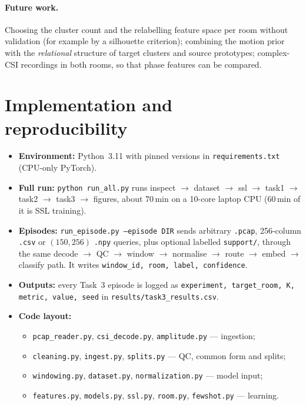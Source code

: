 \documentclass[11pt,a4paper]{article}
\begin{document}
\paragraph{Future work.} Choosing the cluster count and the relabelling feature space per room without validation (for example by a silhouette criterion); combining the motion prior with the \emph{relational} structure of target clusters and source prototypes; complex-CSI recordings in both rooms, so that phase features can be compared.

\section{Implementation and reproducibility}

\begin{itemize}
  \item \textbf{Environment:} Python~3.11 with pinned versions in \texttt{requirements.txt} (CPU-only PyTorch).
  \item \textbf{Full run:} \texttt{python run\_all.py} runs inspect $\to$ dataset $\to$ ssl $\to$ task1 $\to$ task2 $\to$ task3 $\to$ figures, about 70\,min on a 10-core laptop CPU (60\,min of it is SSL training).
  \item \textbf{Episodes:} \texttt{run\_episode.py --episode DIR} sends arbitrary \texttt{.pcap}, 256-column \texttt{.csv} or $(150,256)$ \texttt{.npy} queries, plus optional labelled \texttt{support/}, through the same decode $\to$ QC $\to$ window $\to$ normalise $\to$ route $\to$ embed $\to$ classify path. It writes \texttt{window\_id, room, label, confidence}.
  \item \textbf{Outputs:} every Task~3 episode is logged as \texttt{experiment, target\_room, K, metric, value, seed} in \texttt{results/task3\_results.csv}.
  \item \textbf{Code layout:}
  \begin{itemize}
    \item \texttt{pcap\_reader.py}, \texttt{csi\_decode.py}, \texttt{amplitude.py} --- ingestion;
    \item \texttt{cleaning.py}, \texttt{ingest.py}, \texttt{splits.py} --- QC, common form and splits;
    \item \texttt{windowing.py}, \texttt{dataset.py}, \texttt{normalization.py} --- model input;
    \item \texttt{features.py}, \texttt{models.py}, \texttt{ssl.py}, \texttt{room.py}, \texttt{fewshot.py} --- learning.
  \end{itemize}
\end{itemize}
\end{document}

